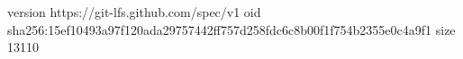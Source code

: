 version https://git-lfs.github.com/spec/v1
oid sha256:15ef10493a97f120ada29757442ff757d258fdc6c8b00f1f754b2355e0c4a9f1
size 13110

